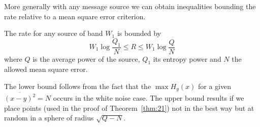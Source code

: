 More generally with any message source we can obtain inequalities bounding
the rate relative to a mean square error criterion.

\begin{theorem}
The rate for any source of band $W_1$ is bounded by
$$
W_1\log\frac{Q_1}{N}\leq R\leq W_1\log\frac{Q}{N}
$$
where $Q$ is the average power of the source, $Q_1$ its entropy power
and $N$ the allowed mean square error.
\end{theorem}

The lower bound follows from the fact that the $\max H_y(x)$ for a given
$\overline{(x-y)^2}=N$ occurs in the white noise case.  The upper bound
results if we place points (used in the proof of Theorem~\ref{thm:21}) not
in the best way but at random in a sphere of radius $\sqrt{Q-N}$.

